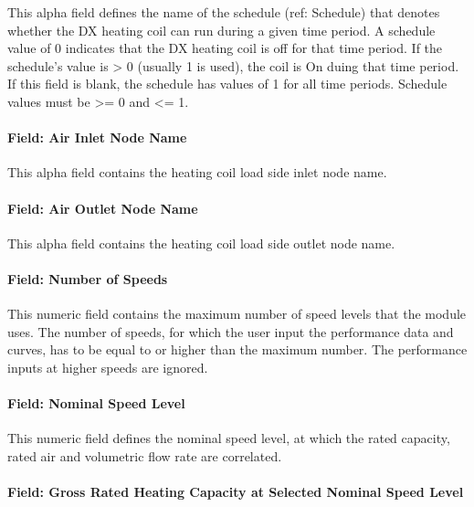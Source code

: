 This alpha field defines the name of the schedule (ref: Schedule) that denotes whether the DX heating coil can run during a given time period. A schedule value of 0 indicates that the DX heating coil is off for that time period. If the schedule's value is \textgreater{} 0 (usually 1 is used), the coil is On duing that time period. If this field is blank, the schedule has values of 1 for all time periods. Schedule values must be \textgreater{}= 0 and \textless{}= 1.

\paragraph{Field: Air Inlet Node Name}\label{field-air-inlet-node-name-15}

This alpha field contains the heating coil load side inlet node name.

\paragraph{Field: Air Outlet Node Name}\label{field-air-outlet-node-name-15}

This alpha field contains the heating coil load side outlet node name.

\paragraph{Field: Number of Speeds}\label{field-number-of-speeds-3}

This numeric field contains the maximum number of speed levels that the module uses. The number of speeds, for which the user input the performance data and curves, has to be equal to or higher than the maximum number. The performance inputs at higher speeds are ignored.

\paragraph{Field: Nominal Speed Level}\label{field-nominal-speed-level-1}

This numeric field defines the nominal speed level, at which the rated capacity, rated air and volumetric flow rate are correlated.

\paragraph{Field: Gross Rated Heating Capacity at Selected Nominal Speed Level}\label{field-gross-rated-heating-capacity-at-selected-nominal-speed-level}

